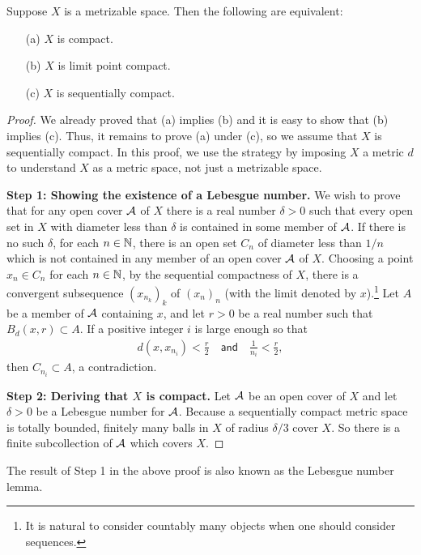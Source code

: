 \begin{thm}
    Suppose $X$ is a metrizable space.
    Then the following are equivalent:
    \begin{enumerate}
        \item[(a)]
        {
            $X$ is compact.
        }
        \item[(b)]
        {
            $X$ is limit point compact.
        }
        \item[(c)]
        {
            $X$ is sequentially compact.
        }
    \end{enumerate}
\end{thm}
\begin{proof}
    We already proved that (a) implies (b) and it is easy to show that (b) implies (c).
    Thus, it remains to prove (a) under (c), so we assume that $X$ is sequentially compact.
    In this proof, we use the strategy by imposing $X$ a metric $d$ to understand $X$ as a metric space, not just a metrizable space.
    
    \textbf{Step 1: Showing the existence of a Lebesgue number.}\newline\noindent
    We wish to prove that for any open cover ${\mathcal{A}}$ of $X$ there is a real number $\delta>0$ such that every open set in $X$ with diameter less than $\delta$ is contained in some member of ${\mathcal{A}}$.
    If there is no such $\delta$, for each $n\in{\mathbb{N}}$, there is an open set $C_n$ of diameter less than $1/n$ which is not contained in any member of an open cover ${\mathcal{A}}$ of $X$.
    Choosing a point $x_n\in C_n$ for each $n\in{\mathbb{N}}$, by the sequential compactness of $X$, there is a convergent subsequence $(x_{n_k})_k$ of $(x_n)_n$ (with the limit denoted by $x$).\footnote{It is natural to consider countably many objects when one should consider sequences.}
    Let $A$ be a member of ${\mathcal{A}}$ containing $x$, and let $r>0$ be a real number such that $B_d(x, r)\subset A$.
    If a positive integer $i$ is large enough so that
    \begin{align*}
        d(x, x_{n_i})<\frac{r}{2}
        \quad\textsf{and}\quad
        \frac{1}{n_i}<\frac{r}{2},
    \end{align*}
    then $C_{n_i}\subset A$, a contradiction.
    
    \textbf{Step 2: Deriving that $X$ is compact.}\newline\noindent
    Let ${\mathcal{A}}$ be an open cover of $X$ and let $\delta>0$ be a Lebesgue number for ${\mathcal{A}}$.
    Because a sequentially compact metric space is totally bounded, finitely many balls in $X$ of radius $\delta/3$ cover $X$.
    So there is a finite subcollection of ${\mathcal{A}}$ which covers $X$.
\end{proof}
\begin{rmk}
    The result of Step 1 in the above proof is also known as the Lebesgue number lemma.
\end{rmk}

